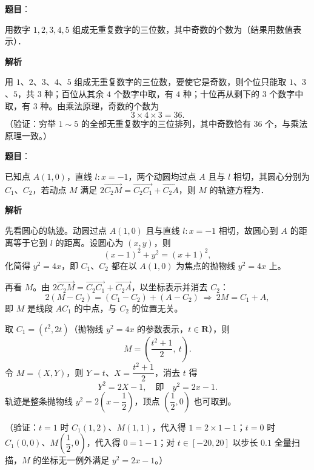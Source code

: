 \begin{answer}

\textbf{题目}：

用数字 \(1,2,3,4,5\) 组成无重复数字的三位数，其中奇数的个数为\gkblank{}（结果用数值表示）．

\textbf{解析}

用 \(1\)、\(2\)、\(3\)、\(4\)、\(5\) 组成无重复数字的三位数，要使它是奇数，则个位只能取 \(1\)、\(3\)、\(5\)，共 \(3\) 种；百位从其余 \(4\) 个数字中取，有 \(4\) 种；十位再从剩下的 \(3\) 个数字中取，有 \(3\) 种。由乘法原理，奇数的个数为
\nopagebreak[4]
\[
3\times4\times3=36.
\]
（验证：穷举 \(1\sim5\) 的全部无重复数字的三位排列，其中奇数恰有 \(36\) 个，与乘法原理一致。）


\end{answer}
\begin{answer}

\textbf{题目}：

已知点 \(A(1,0)\)，直线 \(l:x=-1\)，两个动圆均过点 \(A\) 且与 \(l\) 相切，其圆心分别为 \(C_{1}\)、\(C_{2}\)，若动点 \(M\) 满足 \(2\overrightarrow{C_{2}M}=\overrightarrow{C_{2}C_{1}}+\overrightarrow{C_{2}A}\)，则 \(M\) 的轨迹方程为\gkblank{}．

\textbf{解析}

先看圆心的轨迹。动圆过点 \(A(1,0)\) 且与直线 \(l:x=-1\) 相切，故圆心到 \(A\) 的距离等于它到 \(l\) 的距离。设圆心为 \((x,y)\)，则
\nopagebreak[4]
\[
(x-1)^{2}+y^{2}=(x+1)^{2},
\]
化简得 \(y^{2}=4x\)，即 \(C_{1}\)、\(C_{2}\) 都在以 \(A(1,0)\) 为焦点的抛物线 \(y^{2}=4x\) 上。

再看 \(M\)。由 \(2\overrightarrow{C_{2}M}=\overrightarrow{C_{2}C_{1}}+\overrightarrow{C_{2}A}\)，以坐标表示并消去 \(C_{2}\)：
\nopagebreak[4]
\[
2(M-C_{2})=(C_{1}-C_{2})+(A-C_{2})\ \Longrightarrow\ 2M=C_{1}+A,
\]
即 \(M\) 是线段 \(AC_{1}\) 的中点，与 \(C_{2}\) 的位置无关。

取 \(C_{1}=(t^{2},2t)\)（抛物线 \(y^{2}=4x\) 的参数表示，\(t\in\mathbf{R}\)），则
\nopagebreak[4]
\[
M=\left(\frac{t^{2}+1}{2},\ t\right).
\]
令 \(M=(X,Y)\)，则 \(Y=t\)、\(X=\dfrac{t^{2}+1}{2}\)，消去 \(t\) 得
\nopagebreak[4]
\[
Y^{2}=2X-1,\quad\text{即}\quad y^{2}=2x-1.
\]
轨迹是整条抛物线 \(y^{2}=2\left(x-\dfrac{1}{2}\right)\)，顶点 \(\left(\dfrac{1}{2},0\right)\) 也可取到。

（验证：\(t=1\) 时 \(C_{1}(1,2)\)、\(M(1,1)\)，代入得 \(1=2\times1-1\)；\(t=0\) 时 \(C_{1}(0,0)\)、\(M\left(\dfrac{1}{2},0\right)\)，代入得 \(0=1-1\)；对 \(t\in[-20,20]\) 以步长 \(0.1\) 全量扫描，\(M\) 的坐标无一例外满足 \(y^{2}=2x-1\)。）


\end{answer}
